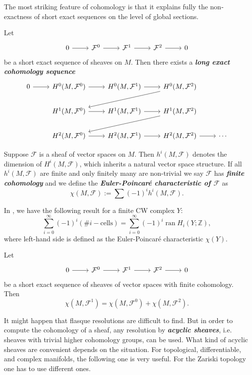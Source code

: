 \documentclass{article}
\newcommand{\Z}{\mathbb{Z}}
\newcommand{\Fc}{\mathcal{F}}
\begin{document}
The most striking feature of cohomology is that it explains fully the non­ exactness of short exact sequences on the level of global sections.
\begin{prop}
	Let
	\[\begin{tikzcd}
		0\arrow[r]&\Fc^0\arrow[r]&\Fc^1\arrow[r]&\Fc^2\arrow[r]&0
	\end{tikzcd}\]
	be a short exact sequence of sheaves on $M$. Then there exists a \textbf{\textit{long exact cohomology sequence}}
	\[\begin{tikzcd}
		0\arrow[r]&H^0(M,\Fc^0)\arrow[r]&H^0(M,\Fc^1)\arrow[r]&H^0(M,\Fc^2)\arrow[dll]\\
		&H^1(M,\Fc^0)\arrow[r]&H^1(M,\Fc^1)\arrow[r]&H^1(M,\Fc^2)\arrow[dll]\\
		&H^2(M,\Fc^0)\arrow[r]&H^2(M,\Fc^1)\arrow[r]&H^2(M,\Fc^2)\arrow[r]&\cdots
	\end{tikzcd}\]
\end{prop}
\begin{defn}
	Suppose $\Fc$ is a sheaf {\color{cyan}of vector spaces} on $M$. Then $h^i(M,\Fc)$ denotes the dimension of $H^i(M,\Fc)$, which inherits a natural vector space structure. If all $h^i(M,\Fc)$ are finite and only finitely many are non-trivial we say $\Fc$ has \textbf{\textit{finite cohomology}} and we define the \textbf{\textit{Euler-Poincaré characteristic of $\Fc$}} as
	\[\chi(M,\Fc):=\sum(-1)^ih^i(M,\Fc).\]
\end{defn}
\begin{remark}
	In \cite{hatcher-at}, we have the following result for a finite CW complex $Y$:
	\[\sum_{i=0}^\infty(-1)^i(\#i-\text{cells})=\sum_{i=0}^\infty(-1)^i\operatorname{ran}H_i(Y;\Z),\]
	where left-hand side is defined as the Euler-Poincaré characteristic $\chi(Y)$.
\end{remark}
\begin{coro}
	Let
	\[\begin{tikzcd}
		0\arrow[r]&\Fc^0\arrow[r]&\Fc^1\arrow[r]&\Fc^2\arrow[r]&0
	\end{tikzcd}\]
	be a short exact sequence of sheaves of vector spaces with finite cohomology. Then
	\[\chi(M,\Fc^1)=\chi(M,\Fc^0)+\chi(M,\Fc^2).\]
\end{coro}
It might happen that flasque resolutions are difficult to find. But in order to compute the cohomology of a sheaf, any resolution by \textbf{\textit{acyclic sheaves}}, i.e. sheaves with trivial higher cohomology groups, can be used. What kind of acyclic sheaves are convenient depends on the situation. For topological, differentiable, and complex manifolds, the following one is very useful. For the Zariski topology one has to use different ones.
\end{document}
